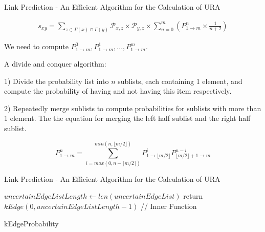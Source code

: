 \documentclass[9pt]{beamer}
\begin{document}
\begin{frame}{Link Prediction - An Efficient Algorithm for the Calculation of URA}

\begin{align*}
s_{xy}=\sum_{z\in \Gamma(x)\cap\Gamma(y)}\mathcal{P}_{x,z}\times\mathcal{P}_{y,z} \times \sum_{n=0}^{m}(P_{1\rightarrow m}^n \times \frac{1}{n+2})
\end{align*}

We need to compute $P_{1\rightarrow m}^0, P_{1\rightarrow m}^1, ..., P_{1\rightarrow m}^m$.

A divide and conquer algorithm:

1) Divide the probability list into $n$ sublists, each containing 1 element, and compute the probability of having and not having this item respectively.

2) Repeatedly merge sublists to compute probabilities for sublists with more than 1 element. The the equation for merging the left half sublist and the right half sublist.

\begin{equation}
P_{1\rightarrow m}^n=\sum_{i=max(0,n-\lceil m/2 \rceil)}^{min(n,\lfloor m/2 \rfloor)}P_{1\rightarrow{\lfloor m/2 \rfloor}}^i P_{{\lfloor m/2 \rfloor}+1\rightarrow m}^{n-i}
\end{equation}

\end{frame}

\begin{frame}{Link Prediction - An Efficient Algorithm for the Calculation of URA}

\begin{algorithm}[H]
  \scriptsize
{}
$uncertainEdgeListLength \leftarrow len(uncertainEdgeList)$\;
return $kEdge(0, uncertainEdgeListLength-1)$\;
// Inner Function\;
\caption{kEdgeProbability}
\end{algorithm}

\end{frame}
\end{document}
